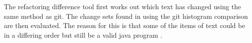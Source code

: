 The refactoring difference tool first works out which text has changed using the same method as git.
The change sets found in using the git histogram comparison are then evaluated.
The reason for this is that some of the items of text could be in a differing order but still be a valid java program
.

 



 







